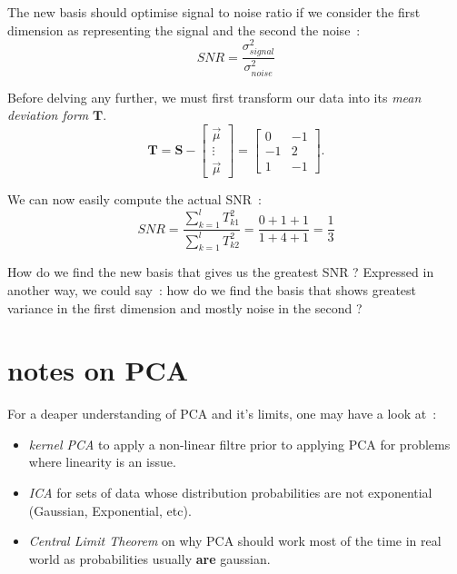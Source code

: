 \documentclass[11pt,twocolumn]{amsart} %
\begin{document}
The new basis should optimise signal to noise ratio if we consider the first dimension as representing the signal and the second the noise~:
\begin{equation*}
  SNR = \frac{\sigma_{signal}^2}{\sigma_{noise}^2}
\end{equation*}

Before delving any further, we must first transform our data into its \emph{mean deviation form} $\textbf{T}$. 
\begin{equation*}
  \textbf{T} = \textbf{S} - \begin{bmatrix}\vec{\mu} \\ \vdots \\ \vec{\mu}\end{bmatrix} = \begin{bmatrix} 0 & -1 \\ -1 & 2 \\ 1 & -1\end{bmatrix}.
\end{equation*}

We can now easily compute the actual SNR~:
\begin{equation*}
  SNR = \frac{\sum_{k=1}^l T_{k1}^2}{\sum_{k=1}^l T_{k2}^2} = \frac{0+1+1}{1+4+1} = \frac{1}{3}
\end{equation*}

How do we find the new basis that gives us the greatest SNR ? Expressed in another way, we could say~: how do we find the basis that shows greatest variance in the first dimension and mostly noise in the second ?

\section{notes on PCA}

For a deaper understanding of PCA and it's limits, one may have a look at~:
\begin{itemize}
  \item \emph{kernel PCA} to apply a non-linear filtre prior to applying PCA for problems where linearity is an issue.
  \item \emph{ICA} for sets of data whose distribution probabilities are not exponential (Gaussian, Exponential, etc).
  \item \emph{Central Limit Theorem} on why PCA should work most of the time in real world as probabilities usually \textbf{are} gaussian.
\end{itemize}

\onecolumn
\end{document}
